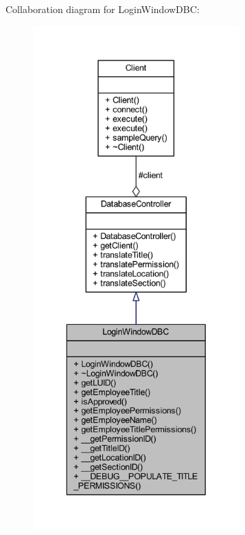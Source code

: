 Collaboration diagram for Login\+Window\+D\+B\+C\+:
\nopagebreak
\begin{figure}[H]
\begin{center}
\leavevmode
\includegraphics[height=550pt]{class_login_window_d_b_c__coll__graph}
\end{center}
\end{figure}
